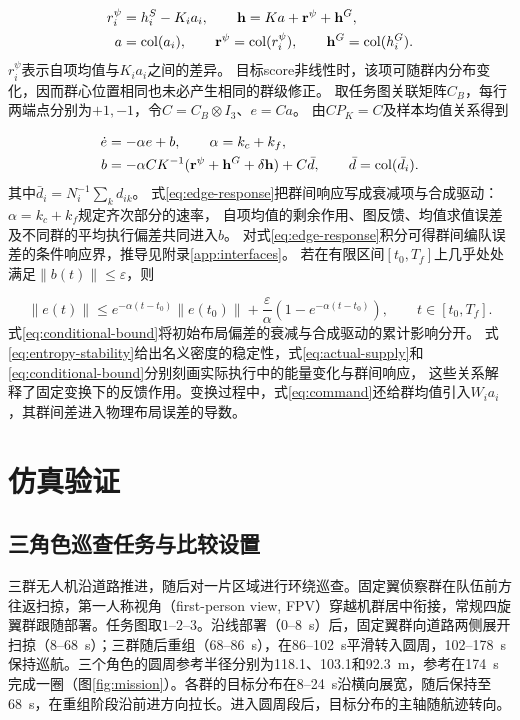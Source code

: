 \documentclass[UTF8,a4paper,11pt,fontset=none]{ctexart}
\begin{document}
\begin{equation}
\begin{aligned}
r_i^\psi&=h_i^S-K_i a_i,\qquad \mathbf h=Ka+\mathbf r^\psi+\mathbf h^G,\\
a&=\operatorname{col}(a_i),\qquad \mathbf r^\psi=\operatorname{col}(r_i^\psi),\qquad\mathbf h^G=\operatorname{col}(h_i^G).
\end{aligned}
\label{eq:shape-drive}
\end{equation}
$r_i^\psi$表示自项均值与$K_i a_i$之间的差异。
目标score非线性时，该项可随群内分布变化，因而群心位置相同也未必产生相同的群级修正。
取任务图关联矩阵$C_B$，每行两端点分别为$+1,-1$，令$C=C_B\otimes I_3$、$e=Ca$。
由$CP_K=C$及样本均值关系得到

\begin{equation}
\begin{aligned}
\dot e&=-\alpha e+b,\qquad\alpha=k_c+k_f,\\
b&=-\alpha CK^{-1}(\mathbf r^\psi+\mathbf h^G+\delta\mathbf h)+C\bar d,
\qquad\bar d=\operatorname{col}(\bar d_i).
\end{aligned}
\label{eq:edge-response}
\end{equation}
其中$\bar d_i=N_i^{-1}\sum_kd_{ik}$。
式\eqref{eq:edge-response}把群间响应写成衰减项与合成驱动：$\alpha=k_c+k_f$规定齐次部分的速率，
自项均值的剩余作用、图反馈、均值求值误差及不同群的平均执行偏差共同进入$b$。
对式\eqref{eq:edge-response}积分可得群间编队误差的条件响应界，推导见附录\ref{app:interfaces}。
若在有限区间$[t_0,T_f]$上几乎处处满足$\|b(t)\|\le\varepsilon$，则

\begin{equation}
\|e(t)\|\le e^{-\alpha(t-t_0)}\|e(t_0)\|
+\frac\varepsilon\alpha\left(1-e^{-\alpha(t-t_0)}\right),\qquad t\in[t_0,T_f].
\label{eq:conditional-bound}
\end{equation}
式\eqref{eq:conditional-bound}将初始布局偏差的衰减与合成驱动的累计影响分开。
式\eqref{eq:entropy-stability}给出名义密度的稳定性，式\eqref{eq:actual-supply}和\eqref{eq:conditional-bound}分别刻画实际执行中的能量变化与群间响应，
这些关系解释了固定变换下的反馈作用。变换过程中，式\eqref{eq:command}还给群均值引入$W_i a_i$，其群间差进入物理布局误差的导数。

\FloatBarrier
\section{仿真验证}\label{sec:experiments}

\subsection{三角色巡查任务与比较设置}
三群无人机沿道路推进，随后对一片区域进行环绕巡查。固定翼侦察群在队伍前方往返扫掠，第一人称视角（first-person view, FPV）穿越机群居中衔接，常规四旋翼群跟随部署。任务图取$1$--$2$--$3$。沿线部署（0--8~s）后，固定翼群向道路两侧展开扫掠（8--68~s）；三群随后重组（68--86~s），在86--102~s平滑转入圆周，102--178~s保持巡航。三个角色的圆周参考半径分别为118.1、103.1和92.3~m，参考在174~s完成一圈（图\ref{fig:mission}）。各群的目标分布在8--24~s沿横向展宽，随后保持至68~s，在重组阶段沿前进方向拉长。进入圆周段后，目标分布的主轴随航迹转向。
\end{document}
